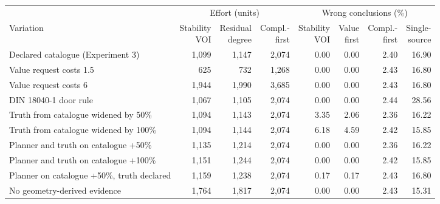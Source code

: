 \begin{tabular}{@{}lrrrrrrr@{}}
\toprule
 & \multicolumn{3}{c}{Effort (units)} & \multicolumn{4}{c}{Wrong conclusions (\%)} \\
\cmidrule(lr){2-4}\cmidrule(l){5-8}
Variation & \shortstack{Stability\\VOI} & \shortstack{Residual\\degree} & \shortstack{Compl.-\\first} & \shortstack{Stability\\VOI} & \shortstack{Value\\first} & \shortstack{Compl.-\\first} & \shortstack{Single-\\source} \\
\midrule
Declared catalogue (Experiment 3) & 1,099 & 1,147 & 2,074 & 0.00 & 0.00 & 2.40 & 16.90 \\
Value request costs 1.5 & 625 & 732 & 1,268 & 0.00 & 0.00 & 2.43 & 16.80 \\
Value request costs 6 & 1,944 & 1,990 & 3,685 & 0.00 & 0.00 & 2.43 & 16.80 \\
DIN 18040-1 door rule & 1,067 & 1,105 & 2,074 & 0.00 & 0.00 & 2.44 & 28.56 \\
Truth from catalogue widened by 50\% & 1,094 & 1,143 & 2,074 & 3.35 & 2.06 & 2.36 & 16.22 \\
Truth from catalogue widened by 100\% & 1,094 & 1,144 & 2,074 & 6.18 & 4.59 & 2.42 & 15.85 \\
Planner and truth on catalogue +50\% & 1,135 & 1,214 & 2,074 & 0.00 & 0.00 & 2.36 & 16.22 \\
Planner and truth on catalogue +100\% & 1,151 & 1,244 & 2,074 & 0.00 & 0.00 & 2.42 & 15.85 \\
Planner on catalogue +50\%, truth declared & 1,159 & 1,238 & 2,074 & 0.17 & 0.17 & 2.43 & 16.80 \\
No geometry-derived evidence & 1,764 & 1,817 & 2,074 & 0.00 & 0.00 & 2.43 & 15.31 \\
\bottomrule
\end{tabular}
